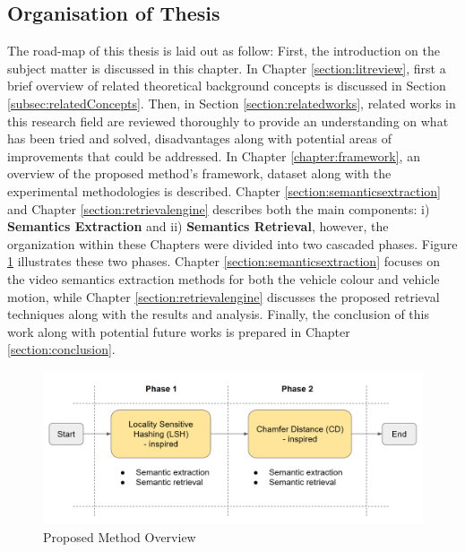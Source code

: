 \subsection{Organisation of Thesis}

The road-map of this thesis is laid out as follow: First, the introduction on the subject matter is discussed in this chapter.
In Chapter \ref{section:litreview}, first a brief overview of related theoretical background concepts is discussed in Section \ref{subsec:relatedConcepts}. Then, in Section \ref{section:relatedworks}, related works in this research field are reviewed thoroughly to provide an understanding on what has been tried and solved, disadvantages along with potential areas of improvements that could be addressed.
In Chapter \ref{chapter:framework}, an overview of the proposed method's framework, dataset along with the experimental methodologies is described.
Chapter \ref{section:semanticsextraction} and Chapter \ref{section:retrievalengine} describes both the main components: i) \textbf{Semantics Extraction} and ii) \textbf{Semantics Retrieval}, however, the organization within these Chapters were divided into two cascaded phases.
Figure \ref{fig:proposedmethodoverview} illustrates these two phases.
Chapter \ref{section:semanticsextraction} focuses on the video semantics extraction methods for both the vehicle colour and vehicle motion, while Chapter \ref{section:retrievalengine} discusses the proposed retrieval techniques along with the results and analysis.
Finally, the conclusion of this work along with potential future works is prepared in Chapter \ref{section:conclusion}.



\begin{figure}[!hbt]\centering
\includegraphics[width=\textwidth]{image/general/phases.PNG}
\caption{Proposed Method Overview}
\label{fig:proposedmethodoverview}
\end{figure}
